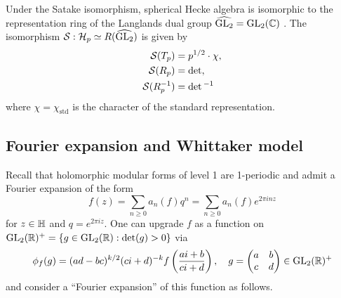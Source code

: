 Under the Satake isomorphism, spherical Hecke algebra is isomorphic to the representation ring of the Langlands dual group $\widehat{\mathrm{GL}_2} = \mathrm{GL}_2(\mathbb{C})$ \cite{gross1998satake}.
The isomorphism $\mathcal{S}: \mathcal{H}_p \simeq R(\widehat{\mathrm{GL}_2})$ is given by
\begin{align*}
\mathcal{S}(T_p) &= p^{1/2} \cdot \chi, \\
\mathcal{S}(R_p) &= \det, \\
\mathcal{S}(R_p^{-1}) &= \det{}^{-1}
\end{align*}
where $\chi = \chi_{\mathrm{std}}$ is the character of the standard representation.


\subsection{Fourier expansion and Whittaker model}
\label{subsec:gl2whit}

Recall that holomorphic modular forms of level 1 are 1-periodic and admit a Fourier expansion of the form
$$
f (z) = \sum_{n \ge 0} a_n(f) q^n =  \sum_{n \ge 0} a_n (f) e^{2 \pi i n z}
$$
for $z \in \mathbb{H}$ and $q = e^{2 \pi i z}$.
One can upgrade $f$ as a function on $\mathrm{GL}_2(\mathbb{R})^+ = \{ g \in \mathrm{GL}_2(\mathbb{R}): \det(g) > 0\}$ via
$$
\phi_f(g) = (ad - bc)^{k/2}(ci+d)^{-k} f\left(\frac{ai + b}{ci + d}\right), \quad g = \begin{pmatrix}
    a & b \\ c & d
\end{pmatrix} \in \mathrm{GL}_2(\mathbb{R})^+
$$
and consider a ``Fourier expansion'' of this function as follows.

